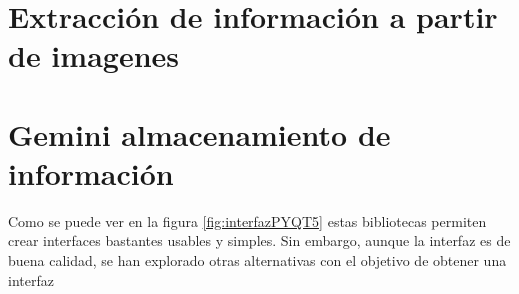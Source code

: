 \section{Extracción de información a partir de imagenes}

\section{Gemini almacenamiento de información}
Como se puede ver en la figura \ref{fig:interfazPYQT5} estas bibliotecas permiten crear interfaces bastantes usables y simples. Sin embargo, aunque la interfaz es de buena calidad, se han explorado otras alternativas con el objetivo de obtener una interfaz 


